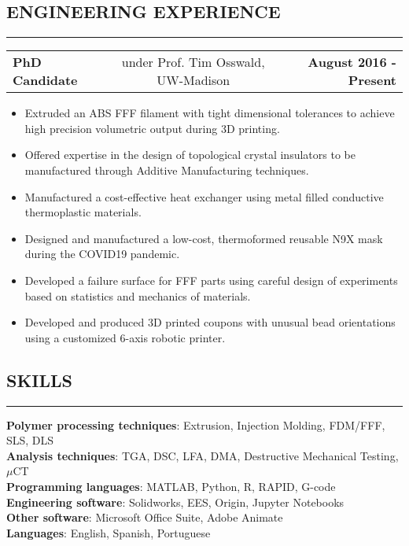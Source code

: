 \documentclass[11pt,letterpaper]{article}
\makeatletter
\newcommand{\headerrow}[3]
{\vspace{0.4em}
\noindent
\begin{tabular*}{\textwidth}{l @{\extracolsep{\fill}} cr}
	\textbf{#1} & %
	#2 &		  %
	\textbf{#3}\\ %
\end{tabular*}}
\makeatother
\begin{document}
\subsection*{ENGINEERING EXPERIENCE}
	\vspace{-0.5em}
	\hrule

	\headerrow
		{PhD Candidate}
		{under Prof. Tim Osswald, UW-Madison}
		{August 2016 - Present}
		
	\begin{itemize}
		\item Extruded an ABS FFF filament with tight dimensional tolerances to achieve high precision volumetric output during 3D printing.
		\item Offered expertise in the design of topological crystal insulators to be manufactured through Additive Manufacturing techniques. 
		\item Manufactured a cost-effective heat exchanger using metal filled conductive thermoplastic materials.
		\item Designed and manufactured a low-cost, thermoformed reusable N9X mask during the COVID19 pandemic.
		\item Developed a failure surface for FFF parts using careful design of experiments based on statistics and mechanics of materials.
		\item Developed and produced 3D printed coupons with unusual bead orientations using a customized 6-axis robotic printer.
	\end{itemize}

\subsection*{SKILLS}
\vspace{-0.5em}
\hrule
\vspace{0.4em}

\textbf{Polymer processing techniques}: Extrusion, Injection Molding, FDM/FFF, SLS, DLS\\
\textbf{Analysis techniques}: TGA, DSC, LFA, DMA, Destructive Mechanical Testing, $\mu$CT\\
\textbf{Programming languages}: MATLAB, Python, R, RAPID, G-code\\
\textbf{Engineering software}: Solidworks, EES, Origin, Jupyter Notebooks\\
\textbf{Other software}: Microsoft Office Suite, Adobe Animate\\
\textbf{Languages}: English, Spanish, Portuguese\\
\end{document}

